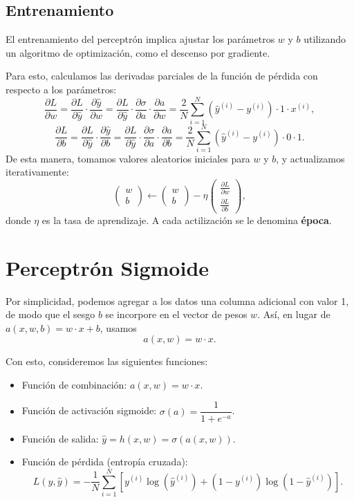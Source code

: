 \documentclass[a4,11pt]{aleph-notas}
\begin{document}
\subsection*{Entrenamiento}

El entrenamiento del perceptrón implica ajustar los parámetros \(w\) y \(b\) utilizando un algoritmo de optimización, como el descenso por gradiente.

Para esto, calculamos las derivadas parciales de la función de pérdida con respecto a los parámetros:
\[
    \frac{\partial L}{\partial w} 
    = \frac{\partial L}{\partial \hat y} \cdot \frac{\partial \hat y}{\partial w}
    = \frac{\partial L}{\partial \hat y} \cdot \frac{\partial \sigma}{\partial a} \cdot \frac{\partial a}{\partial w}
    = \frac{2}{N} \sum_{i=1}^N ( \hat y^{(i)} - y^{(i)} ) \cdot 1 \cdot x^{(i)},
\]
\[
    \frac{\partial L}{\partial b} 
    = \frac{\partial L}{\partial \hat y} \cdot \frac{\partial \hat y}{\partial b}
    = \frac{\partial L}{\partial \hat y} \cdot \frac{\partial \sigma}{\partial a} \cdot \frac{\partial a}{\partial b}
    = \frac{2}{N} \sum_{i=1}^N ( \hat y^{(i)} - y^{(i)} ) \cdot 0 \cdot 1.
\]
De esta manera, tomamos valores aleatorios iniciales para \(w\) y \(b\), y actualizamos iterativamente:
\[
    \begin{pmatrix}
        w \\ b
    \end{pmatrix}
    \leftarrow
    \begin{pmatrix}
        w \\ b
    \end{pmatrix}
    - \eta
    \begin{pmatrix}
        \frac{\partial L}{\partial w} \\[6pt]
        \frac{\partial L}{\partial b}
    \end{pmatrix},
\]
donde \(\eta\) es la tasa de aprendizaje. A cada actilización se le denomina \textbf{época}.

\section{Perceptrón Sigmoide}

Por simplicidad, podemos agregar a los datos una columna adicional con valor 1, de modo que el sesgo \(b\) se incorpore en el vector de pesos \(w\). Así, en lugar de \(a(x,w,b) = w\cdot  x + b\), usamos
\[
    a(x,w) = w\cdot  x.
\]

Con esto, consideremos las siguientes funciones:
\begin{itemize}
    \item Función de combinación: \(a(x,w) = w\cdot  x\).
    \item Función de activación sigmoide: \(\sigma(a) = \dfrac{1}{1 + e^{-a}}\).
    \item Función de salida: \(\hat y = h(x,w) = \sigma(a(x,w))\).
    \item Función de pérdida (entropía cruzada):
    \[
        L(y,\hat y) = -\frac{1}{N} \sum_{i=1}^N \left[ y^{(i)} \log(\hat y^{(i)}) + (1 - y^{(i)}) \log(1 - \hat y^{(i)}) \right].
    \]
\end{itemize}
\end{document}
